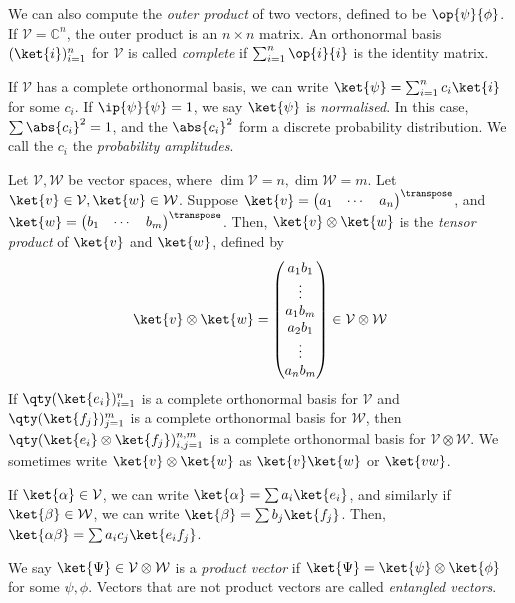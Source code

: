 We can also compute the \emph{outer product} of two vectors, defined to be \( \op{\psi}{\phi} \).
If \( \mathcal V = \mathbb C^n \), the outer product is an \( n \times n \) matrix.
An orthonormal basis \( (\ket{i})_{i=1}^n \) for \( \mathcal V \) is called \emph{complete} if \( \sum_{i=1}^n \op{i}{i} \) is the identity matrix.

If \( \mathcal V \) has a complete orthonormal basis, we can write \( \ket{\psi} = \sum_{i=1}^n c_i \ket{i} \) for some \( c_i \).
If \( \ip{\psi}{\psi} = 1 \), we say \( \ket{\psi} \) is \emph{normalised}.
In this case, \( \sum \abs{c_i}^2 = 1 \), and the \( \abs{c_i}^2 \) form a discrete probability distribution.
We call the \( c_i \) the \emph{probability amplitudes}.

Let \( \mathcal V, \mathcal W \) be vector spaces, where \( \dim \mathcal V = n, \dim \mathcal W = m \).
Let \( \ket{v} \in \mathcal V, \ket{w} \in \mathcal W \).
Suppose \( \ket{v} = \begin{pmatrix}
    a_1 & \cdots & a_n
\end{pmatrix}^\transpose \), and \( \ket{w} = \begin{pmatrix}
    b_1 & \cdots & b_m
\end{pmatrix}^\transpose \).
Then, \( \ket{v} \otimes \ket{w} \) is the \emph{tensor product} of \( \ket{v} \) and \( \ket{w} \), defined by
\[ \ket{v} \otimes \ket{w} = \begin{pmatrix}
    a_1 b_1 \\
    \vdots \\
    a_1 b_m \\
    a_2 b_1 \\
    \vdots \\
    a_n b_m
\end{pmatrix} \in \mathcal V \otimes \mathcal W \]
If \( \qty(\ket{e_i})_{i=1}^n \) is a complete orthonormal basis for \( \mathcal V \) and \( \qty(\ket{f_j})_{j=1}^m \) is a complete orthonormal basis for \( \mathcal W \), then \( \qty(\ket{e_i} \otimes \ket{f_j})_{i,j=1}^{n,m} \) is a complete orthonormal basis for \( \mathcal V \otimes \mathcal W \).
We sometimes write \( \ket{v} \otimes \ket{w} \) as \( \ket{v} \ket{w} \) or \( \ket{vw} \).

If \( \ket{\alpha} \in \mathcal V \), we can write \( \ket{\alpha} = \sum a_i \ket{e_i} \), and similarly if \( \ket{\beta} \in \mathcal W \), we can write \( \ket{\beta} = \sum b_j \ket{f_j} \).
Then, \( \ket{\alpha\beta} = \sum a_i c_j \ket{e_i f_j} \).

We say \( \ket{\Psi} \in \mathcal V \otimes \mathcal W \) is a \emph{product vector} if \( \ket{\Psi} = \ket{\psi}\otimes\ket{\phi} \) for some \( \psi, \phi \).
Vectors that are not product vectors are called \emph{entangled vectors}.


